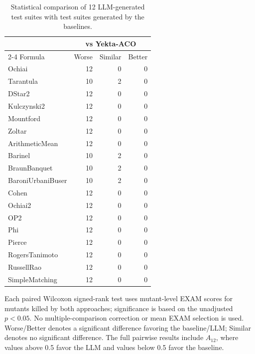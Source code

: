 \begin{table}[t]
\centering
\caption{Statistical comparison of 12 LLM-generated test suites with test suites generated by the baselines.}
\label{tab:rq3bw-pairwise-counts}
\begin{tabular}{lrrr}
\hline
 & \multicolumn{3}{c}{vs Yekta-ACO} \\
\cline{2-4}
Formula & Worse & Similar & Better \\
\hline
Ochiai & 12 & 0 & 0 \\
Tarantula & 10 & 2 & 0 \\
DStar2 & 12 & 0 & 0 \\
Kulczynski2 & 12 & 0 & 0 \\
Mountford & 12 & 0 & 0 \\
Zoltar & 12 & 0 & 0 \\
ArithmeticMean & 12 & 0 & 0 \\
Barinel & 10 & 2 & 0 \\
BraunBanquet & 10 & 2 & 0 \\
BaroniUrbaniBuser & 10 & 2 & 0 \\
Cohen & 12 & 0 & 0 \\
Ochiai2 & 12 & 0 & 0 \\
OP2 & 12 & 0 & 0 \\
Phi & 12 & 0 & 0 \\
Pierce & 12 & 0 & 0 \\
RogersTanimoto & 12 & 0 & 0 \\
RussellRao & 12 & 0 & 0 \\
SimpleMatching & 12 & 0 & 0 \\
\hline
\end{tabular}
\par\smallskip
\begin{minipage}{\linewidth}\footnotesize Each paired Wilcoxon signed-rank test uses mutant-level EXAM scores for mutants killed by both approaches; significance is based on the unadjusted $p<0.05$. No multiple-comparison correction or mean EXAM selection is used. Worse/Better denotes a significant difference favoring the baseline/LLM; Similar denotes no significant difference. The full pairwise results include $A_{12}$, where values above 0.5 favor the LLM and values below 0.5 favor the baseline.
\end{minipage}
\end{table}
